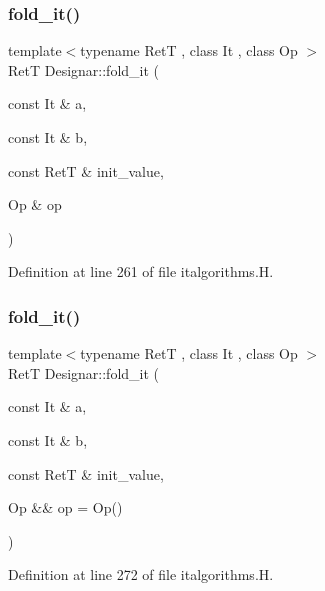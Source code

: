 \subsubsection{\texorpdfstring{fold\+\_\+it()}{fold\_it()}\hspace{0.1cm}{\footnotesize\ttfamily [1/4]}}
{\footnotesize\ttfamily template$<$typename RetT , class It , class Op $>$ \\
RetT Designar\+::fold\+\_\+it (\begin{DoxyParamCaption}\item[{const It \&}]{a,  }\item[{const It \&}]{b,  }\item[{const RetT \&}]{init\+\_\+value,  }\item[{Op \&}]{op }\end{DoxyParamCaption})}



Definition at line 261 of file italgorithms.\+H.

\mbox{\label{namespace_designar_a412ed1014bc60b2db6211871855ccba9}} 
\subsubsection{\texorpdfstring{fold\+\_\+it()}{fold\_it()}\hspace{0.1cm}{\footnotesize\ttfamily [2/4]}}
{\footnotesize\ttfamily template$<$typename RetT , class It , class Op $>$ \\
RetT Designar\+::fold\+\_\+it (\begin{DoxyParamCaption}\item[{const It \&}]{a,  }\item[{const It \&}]{b,  }\item[{const RetT \&}]{init\+\_\+value,  }\item[{Op \&\&}]{op = {\ttfamily Op()} }\end{DoxyParamCaption})}



Definition at line 272 of file italgorithms.\+H.

\mbox{\label{namespace_designar_a034ad070a0aac24d53fd1c4612d2c58c}} 

